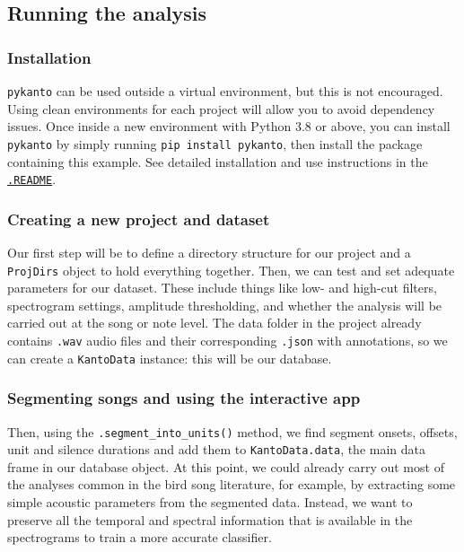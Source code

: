 \subsection{Running the analysis}
\subsubsection{Installation}

\texttt{pykanto} can be used outside a virtual environment, but this is not encouraged.
Using clean environments for each project will allow you to avoid dependency issues. Once inside a new environment with Python 3.8 or above, you can
install \texttt{pykanto} by simply running \texttt{pip install pykanto}, then install the
package containing this example. See detailed installation and use instructions
in the \href{https://github.com/nilomr/pykanto-example}{\texttt{.README}}.

\subsubsection{Creating a new project and dataset}

Our first step will be to define a directory structure for our project and a
\texttt{ProjDirs} object to hold everything together. Then, we can test and set
adequate parameters for our dataset. These include things like low- and high-cut
filters, spectrogram settings, amplitude thresholding, and whether the analysis
will be carried out at the song or note level. The data folder in the project
already contains \texttt{.wav} audio files and their corresponding
\texttt{.json} with annotations, so we can create a \texttt{KantoData} instance:
this will be our database.

\subsubsection{Segmenting songs and using the interactive app}

Then, using the \texttt{.segment\_into\_units()} method, we find segment onsets,
offsets, unit and silence durations and add them to \texttt{KantoData.data}, the
main data frame in our database object. At this point, we could already carry
out most of the analyses common in the bird song literature, for example, by
extracting some simple acoustic parameters from the segmented data. Instead, we
want to preserve all the temporal and spectral information that is available in
the spectrograms to train a more accurate classifier.

